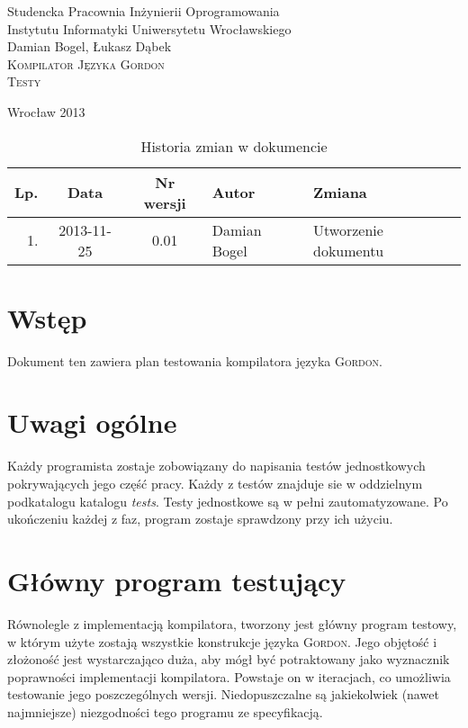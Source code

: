 \documentclass{documentation}
\begin{document}
\begin{titlepage}
\begin{center}
Studencka Pracownia Inżynierii Oprogramowania\\
Instytutu Informatyki Uniwersytetu Wrocławskiego\\[6cm]

Damian Bogel, Łukasz Dąbek\\[1cm]
\textsc{\LARGE Kompilator Języka Gordon}\\[0.5cm]
\textsc{\large Testy}

\vfill
Wrocław 2013 \\[2.5cm]

\end{center}
\end{titlepage}

\newpage
\begin{table}
	\centering
	\caption{Historia zmian w dokumencie}
		\begin{tabular}{|r|c|c|l|l|}
		\hline
		Lp.  & Data       & Nr wersji & Autor                 & Zmiana \\ \hline
		1.   & 2013-11-25 & 0.01 & Damian Bogel & Utworzenie dokumentu \\ \hline
	\end{tabular}
\end{table}
\newpage

\tableofcontents
\setcounter{page}{2}

\newpage

\section{Wstęp}
\noindent Dokument ten zawiera plan testowania kompilatora języka
\textsc{Gordon}.

\section{Uwagi ogólne}
\noindent Każdy programista zostaje zobowiązany do napisania testów
jednostkowych pokrywających jego część pracy. Każdy z testów znajduje sie w
oddzielnym podkatalogu katalogu \emph{tests}. Testy jednostkowe są w pełni
zautomatyzowane. Po ukończeniu każdej z faz, program zostaje sprawdzony przy
ich użyciu.

\section{Główny program testujący}
\noindent Równolegle z implementacją kompilatora, tworzony jest główny program
testowy, w którym użyte zostają wszystkie konstrukcje języka \textsc{Gordon}.
Jego objętość i złożoność jest wystarczająco duża, aby mógł być potraktowany
jako wyznacznik poprawności implementacji kompilatora. Powstaje on w iteracjach,
co umożliwia testowanie jego poszczególnych wersji. Niedopuszczalne są
jakiekolwiek (nawet najmniejsze) niezgodności tego programu ze specyfikacją.
\end{document}
